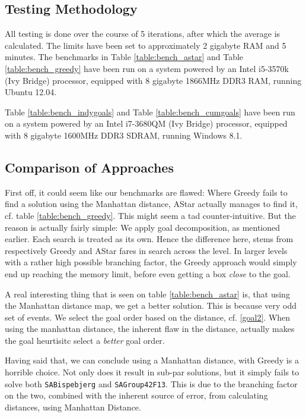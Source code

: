 \documentclass[letterpaper]{article}
\begin{document}
	\subsection{Testing Methodology}
		All testing is done over the course of 5 iterations, after which the average is calculated. The limits have been set to approximately 2 gigabyte RAM and 5 minutes. The benchmarks in Table \ref{table:bench_astar} and Table \ref{table:bench_greedy} have been run on a system powered by an Intel i5-3570k (Ivy Bridge) processor, equipped with 8 gigabyte 1866MHz DDR3 RAM, running Ubuntu 12.04.
		
		Table \ref{table:bench_indygoals} and Table \ref{table:bench_cumgoals} have been run on a system powered by an Intel i7-3680QM (Ivy Bridge) processor, equipped with 8 gigabyte 1600MHz DDR3 SDRAM, running Windows 8.1.

	\subsection{Comparison of Approaches}
		First off, it could seem like our benchmarks are flawed: Where Greedy fails to find a solution using the Manhattan distance, AStar actually manages to find it, cf. table \ref{table:bench_greedy}. This might seem a tad counter-intuitive. But the reason is actually fairly simple:  We apply goal decomposition, as mentioned earlier. Each search is treated as its own. Hence the difference here, stems from respectively Greedy and AStar fares in search across the level. In larger levels with a rather high possible branching factor, the Greedy approach would simply end up reaching the memory limit, before even getting a box \emph{close} to the goal.

		A real interesting thing that is seen on table \ref{table:bench_astar} is, that using the Manhattan distance map, we get a better solution. This is because very odd set of events. We select the goal order based on the distance, cf. \ref{goal2}. When using the manhattan distance, the inherent flaw in the distance, actually makes the goal heurtisitc select a \emph{better} goal order.

		Having said that, we can conclude using a Manhattan distance, with Greedy is a horrible choice. Not only does it result in sub-par solutions, but it simply fails to solve both \verb=SABispebjerg= and \verb=SAGroup42F13=. This is due to the branching factor on the two, combined with the inherent source of error, from calculating distances, using Manhattan Distance. 
\end{document}
